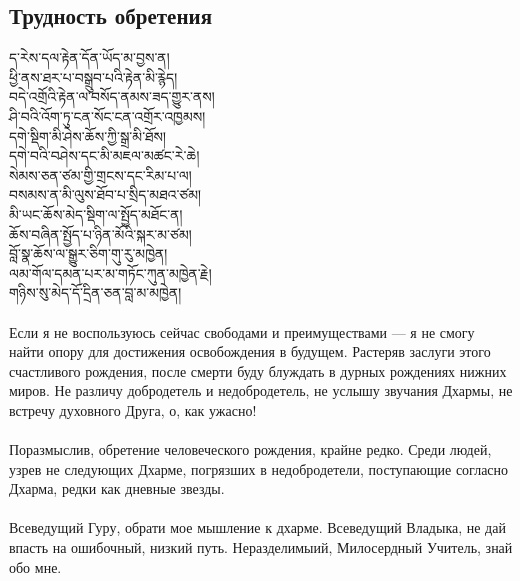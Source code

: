 \subsection*{Трудность обретения}
\ti ད་རེས་དལ་རྟེན་དོན་ཡོད་མ་བྱས་ན།\\
ཕྱི་ནས་ཐར་པ་བསྒྲུབ་པའི་རྟེན་མི་རྙེད།\\
བདེ་འགྲོའི་རྟེན་ལ་བསོད་ནམས་ཟད་གྱུར་ནས།\\
ཤི་བའི་འོག་ཏུ་ངན་སོང་ངན་འགྲོར་འཁྱམས།\\
དགེ་སྡིག་མི་ཤེས་ཆོས་ཀྱི་སྒྲ་མི་ཐོས།\\
དགེ་བའི་བཤེས་དང་མི་མཇལ་མཚང་རེ་ཆེ།\\
སེམས་ཅན་ཙམ་གྱི་གྲངས་དང་རིམ་པ་ལ།\\
བསམས་ན་མི་ལུས་ཐོབ་པ་སྲིད་མཐའ་ཙམ།\\
མི་ཡང་ཆོས་མེད་སྡིག་ལ་སྤྱོད་མཐོང་ན།\\
ཆོས་བཞིན་སྤྱོད་པ་ཉིན་མོའི་སྐར་མ་ཙམ།\\
བློ་སྣ་ཆོས་ལ་སྒྱུར་ཅིག་གུ་རུ་མཁྱེན།\\
ལམ་གོལ་དམན་པར་མ་གཏོང་ཀུན་མཁྱེན་རྗེ།\\
གཉིས་སུ་མེད་དོ་དྲིན་ཅན་བླ་མ་མཁྱེན།\\
\\
\ru
Если я не воспользуюсь сейчас свободами и преимуществами —
я не смогу найти опору для достижения освобождения в будущем.
Растеряв заслуги этого счастливого рождения,
после смерти буду блуждать в дурных рождениях нижних миров.
Не различу добродетель и недобродетель, не услышу звучания Дхармы,
не встречу духовного Друга, о, как ужасно!\\
\\
Поразмыслив, обретение человеческого рождения, крайне ред\-ко.
Среди людей, узрев не следующих Дхарме, погрязших в недобродетели,
поступающие согласно Дхарма, редки как дневные звезды.\\
\\
Всеведущий Гуру, обрати мое мышление к дхарме.
Всеведущий Владыка, не дай впасть на ошибочный, низкий путь.
Нераздели\-мыий, Милосердный Учитель, знай обо мне.
\newpage
